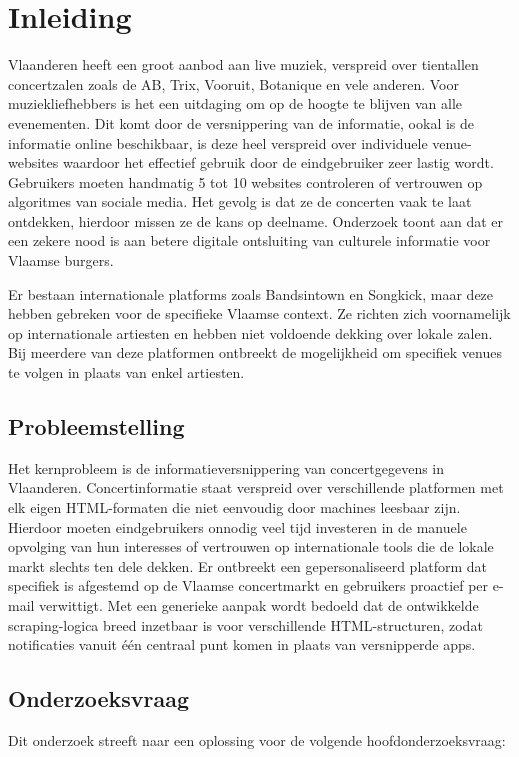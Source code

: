 \section{Inleiding}%
\label{sec:inleiding}

Vlaanderen heeft een groot aanbod aan live muziek, verspreid over tientallen concertzalen zoals de AB, Trix, Vooruit, Botanique en vele anderen. Voor muziekliefhebbers is het een uitdaging om op de hoogte te blijven van alle evenementen. Dit komt door de versnippering van de informatie, ookal is de informatie online beschikbaar, is deze heel verspreid over individuele venue-websites waardoor het effectief gebruik door de eindgebruiker zeer lastig wordt. Gebruikers moeten handmatig 5 tot 10 websites controleren of vertrouwen op algoritmes van sociale media. Het gevolg is dat ze de concerten vaak te laat ontdekken, hierdoor missen ze de kans op deelname. Onderzoek toont aan dat er een zekere nood is aan betere digitale ontsluiting van culturele informatie voor Vlaamse burgers\autocite{Rutten2018}.

Er bestaan internationale platforms zoals Bandsintown en Songkick, maar deze hebben gebreken voor de specifieke Vlaamse context. Ze richten zich voornamelijk op internationale artiesten en hebben niet voldoende dekking over lokale zalen. Bij meerdere van deze platformen ontbreekt de mogelijkheid om specifiek venues te volgen in plaats van enkel artiesten.

\subsection{Probleemstelling}
Het kernprobleem is de informatieversnippering van concertgegevens in Vlaanderen. Concertinformatie staat verspreid over verschillende platformen met elk eigen HTML-formaten die niet eenvoudig door machines leesbaar zijn. Hierdoor moeten eindgebruikers onnodig veel tijd investeren in de manuele opvolging van hun interesses of vertrouwen op internationale tools die de lokale markt slechts ten dele dekken. Er ontbreekt een gepersonaliseerd platform dat specifiek is afgestemd op de Vlaamse concertmarkt en gebruikers proactief per e-mail verwittigt. Met een generieke aanpak wordt bedoeld dat de ontwikkelde scraping-logica breed inzetbaar is voor verschillende HTML-structuren, zodat notificaties vanuit één centraal punt komen in plaats van versnipperde apps.

\subsection{Onderzoeksvraag}
Dit onderzoek streeft naar een oplossing voor de volgende hoofdonderzoeksvraag:

